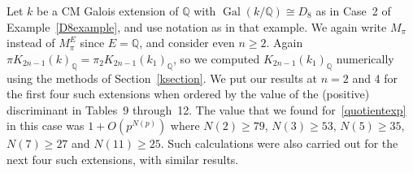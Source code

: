 \documentclass{amsart}
\begin{document}
\begin{example}\label{D8CMcomputation}
Let $ k $ be a CM Galois extension of $ {\mathbb Q} $ with $ {\operatorname{Gal}}(k/{\mathbb Q}) {\cong} D_8 $ as in Case~2 of Example~\ref{D8example}, 
and use notation as in that example.  We again write $ M_\pi $ instead of $ M_\pi^E $ since $ E={\mathbb Q} $, and consider
even $  n \ge 2 $.
Again $ \pi {K_{2n-1}(k)_{\mathbb Q}}= \pi_2 {K_{2n-1}(k_1)_{\mathbb Q}}$, so we computed $ {K_{2n-1}(k_1)_{\mathbb Q}}$ numerically using the methods of Section~\ref{ksection}.
We put our results at $ n=2 $ and 4 for the first four such extensions when ordered by the value of the
(positive) discriminant in Tables~9 through~12.
The value that we found for~\eqref{quotientexp} in this case was $ 1+O(p^{N(p)}) $ where
$ N(2) \ge 79 $, $ N(3) \ge 53 $, $ N(5) \ge 35 $, $ N(7) \ge 27 $ and $ N(11) \ge 25 $.
Such calculations were also carried out for the next four such extensions, with similar results.
\end{example}
\end{document}
